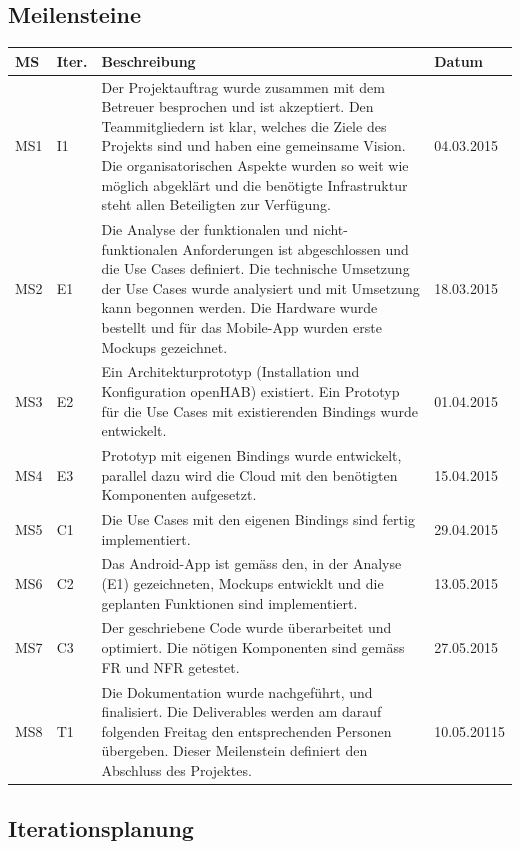 \subsection*{Meilensteine}
\begin{tabularx}{\textwidth}{lp{1cm}Xl}
	\textbf{MS}	& \textbf{Iter.} & \textbf{Beschreibung} & \textbf{Datum} \\ \hline
	MS1	& I1 & Der Projektauftrag wurde zusammen mit dem Betreuer besprochen und ist akzeptiert. Den Teammitgliedern ist klar, welches die Ziele des Projekts sind und haben eine gemeinsame Vision. Die organisatorischen Aspekte wurden so weit wie möglich abgeklärt und die benötigte Infrastruktur steht allen Beteiligten zur Verfügung.	& 04.03.2015 \\ \hline
	MS2 & E1 & Die Analyse der funktionalen und nicht-funktionalen Anforderungen ist abgeschlossen und die Use Cases definiert. Die technische Umsetzung der Use Cases wurde analysiert und mit Umsetzung kann begonnen werden. Die Hardware wurde bestellt und für das Mobile-App wurden erste Mockups gezeichnet.	& 18.03.2015 \\ \hline
	MS3 & E2 & Ein Architekturprototyp (Installation und Konfiguration openHAB) existiert. Ein Prototyp für die Use Cases mit existierenden Bindings wurde entwickelt.	& 01.04.2015 \\ \hline
	MS4 & E3 & Prototyp mit eigenen Bindings wurde entwickelt, parallel dazu wird die Cloud mit den benötigten Komponenten aufgesetzt.	& 15.04.2015 \\ \hline
 	MS5 & C1 & Die Use Cases mit den eigenen Bindings sind fertig implementiert. & 29.04.2015 \\ \hline
	MS6	& C2 & Das Android-App ist gemäss den, in der Analyse (E1) gezeichneten, Mockups entwicklt und die geplanten Funktionen sind implementiert. & 13.05.2015 \\ \hline 
 	MS7 & C3 & Der geschriebene Code wurde überarbeitet und optimiert. Die nötigen Komponenten sind gemäss FR und NFR getestet. & 27.05.2015 \\ \hline
	MS8 & T1 & Die Dokumentation wurde nachgeführt, und finalisiert. Die Deliverables werden am darauf folgenden Freitag den entsprechenden Personen übergeben. Dieser Meilenstein definiert den Abschluss des Projektes. & 10.05.20115 \\ \hline
\end{tabularx}

\subsection*{Iterationsplanung}
\tbd

